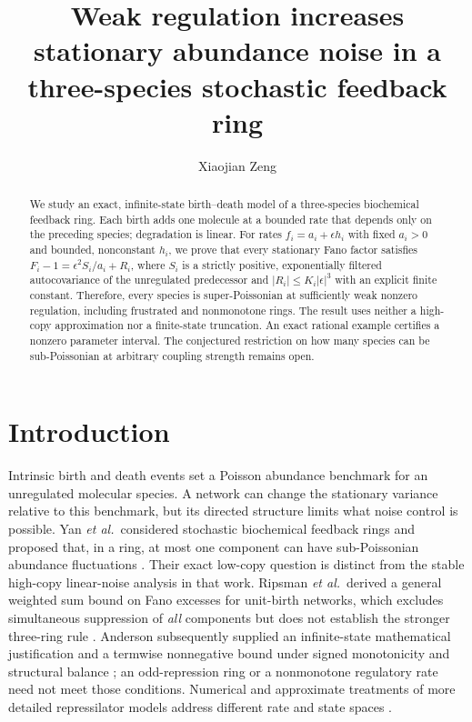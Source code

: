 \documentclass[aps,pre,twocolumn,showpacs,amsmath,amssymb]{revtex4-2}
\begin{document}
\title{Weak regulation increases stationary abundance noise in a three-species stochastic feedback ring}
\author{Xiaojian Zeng}

\begin{abstract}
We study an exact, infinite-state birth--death model of a three-species biochemical feedback ring. Each birth adds one molecule at a bounded rate that depends only on the preceding species; degradation is linear. For rates $f_i=a_i+\epsilon h_i$ with fixed $a_i>0$ and bounded, nonconstant $h_i$, we prove that every stationary Fano factor satisfies $F_i-1=\epsilon^2 S_i/a_i+R_i$, where $S_i$ is a strictly positive, exponentially filtered autocovariance of the unregulated predecessor and $|R_i|\leq K_i|\epsilon|^3$ with an explicit finite constant. Therefore, every species is super-Poissonian at sufficiently weak nonzero regulation, including frustrated and nonmonotone rings. The result uses neither a high-copy approximation nor a finite-state truncation. An exact rational example certifies a nonzero parameter interval. The conjectured restriction on how many species can be sub-Poissonian at arbitrary coupling strength remains open.
\end{abstract}

\maketitle

\section{Introduction}
Intrinsic birth and death events set a Poisson abundance benchmark for an unregulated molecular species. A network can change the stationary variance relative to this benchmark, but its directed structure limits what noise control is possible. Yan \emph{et al.}\ considered stochastic biochemical feedback rings and proposed that, in a ring, at most one component can have sub-Poissonian abundance fluctuations \cite{Yan2019}. Their exact low-copy question is distinct from the stable high-copy linear-noise analysis in that work. Ripsman \emph{et al.}\ derived a general weighted sum bound on Fano excesses for unit-birth networks, which excludes simultaneous suppression of \emph{all} components but does not establish the stronger three-ring rule \cite{Ripsman2025}. Anderson subsequently supplied an infinite-state mathematical justification and a termwise nonnegative bound under signed monotonicity and structural balance \cite{Anderson2026Balance}; an odd-repression ring or a nonmonotone regulatory rate need not meet those conditions. Numerical and approximate treatments of more detailed repressilator models address different rate and state spaces \cite{JiaGrima2024}.
\end{document}
